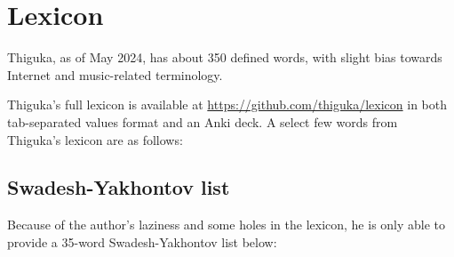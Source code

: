 
\newpage
\section{Lexicon}
Thiguka, as of May 2024, has about 350 defined words, with slight bias towards Internet and music-related terminology.

Thiguka's full lexicon is available at \url{https://github.com/thiguka/lexicon} in both tab-separated values format and an Anki deck.
A select few words from Thiguka's lexicon are as follows:

\subsection{Swadesh-Yakhontov list}
Because of the author's laziness and some holes in the lexicon, he is only able to provide a 35-word Swadesh-Yakhontov list below:

